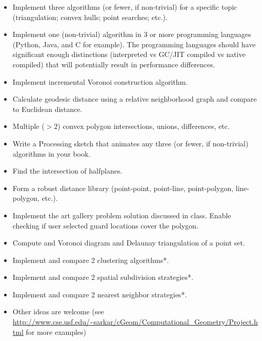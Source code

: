 \documentclass[a4paper,12pt]{article}
\begin{document}
\begin{itemize}
    \item Implement three algorithms (or fewer, if non-trivial) for a specific topic (triangulation; convex hulls; point searches; etc.).
    \item Implement one (non-trivial) algorithm in 3 or more programming languages (Python, Java, and C for example). The programming languages should have significant enough distinctions (interpreted vs GC/JIT compiled vs native compiled) that will potentially result in performance differences.
    \item Implement incremental Voronoi construction algorithm.
    \item Calculate geodesic distance using a relative neighborhood graph and compare to Euclidean distance.
    \item Multiple ($>2$) convex polygon intersections, unions, differences, etc.
    \item Write a Processing sketch that animates any three (or fewer, if non-trivial) algorithms in your book. 
    \item Find the intersection of halfplanes.
    \item Form a robust distance library (point-point, point-line, point-polygon, line-polygon, etc.).
    \item Implement the art gallery problem solution discussed in class. Enable checking if user selected guard locations cover the polygon.
    \item Compute and Voronoi diagram and Delaunay triangulation of a point set.
    \item Implement and compare 2 clustering algorithms*.
	\item Implement and compare 2 spatial subdivision strategies*.
	\item Implement and compare 2 nearest neighbor strategies*.
    \item Other ideas are welcome (see \url{http://www.cse.usf.edu/~sarkar/cGeom/Computational_Geometry/Project.html} for more examples)
\end{itemize}
\end{document}
